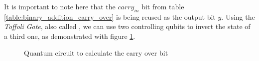 It is important to note here that the $carry_{in}$ bit from table \ref{table:binary_addition_carry_over} is being reused as the output bit $y$. Using the \emph{Toffoli Gate}, also called \cite{qiskit_ccxgate_nodate}, we can use two controlling qubits to invert the state of a third one, as demonstrated with figure \ref{fig:carry_over_circuit}.

\begin{figure}[!h]
    \centering
    \caption{Quantum circuit to calculate the carry over bit}
    \label{fig:carry_over_circuit}
\end{figure}


